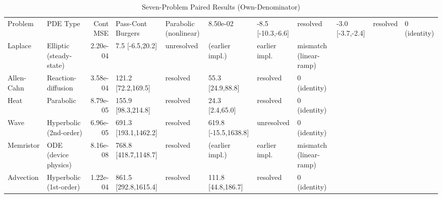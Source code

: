 \begin{table}[htbp]
\centering
\caption{Seven-Problem Paired Results (Own-Denominator)}
\label{tab:sevenprob}
\begin{tabular}{llrlllll}
\hline
Problem & PDE Type & Cont MSE & Pass-Cont %
\hline
Burgers & Parabolic (nonlinear) & 8.50e-02 & -8.5 [-10.3,-6.6] & resolved & -3.0 [-3.7,-2.4] & resolved & 0 (identity) \\
Laplace & Elliptic (steady-state) & 2.20e-04 & 7.5 [-6.5,20.2] & unresolved & (earlier impl.) & earlier impl. & mismatch (linear-ramp) \\
Allen-Cahn & Reaction-diffusion & 3.58e-04 & 121.2 [72.2,169.5] & resolved & 55.3 [24.9,88.8] & resolved & 0 (identity) \\
Heat & Parabolic & 8.79e-05 & 155.9 [98.3,214.8] & resolved & 24.3 [2.4,65.0] & resolved & 0 (identity) \\
Wave & Hyperbolic (2nd-order) & 6.96e-05 & 691.3 [193.1,1462.2] & resolved & 619.8 [-15.5,1638.8] & unresolved & 0 (identity) \\
Memristor & ODE (device physics) & 8.16e-08 & 768.8 [418.7,1148.7] & resolved & (earlier impl.) & earlier impl. & mismatch (linear-ramp) \\
Advection & Hyperbolic (1st-order) & 1.22e-04 & 861.5 [292.8,1615.4] & resolved & 111.8 [44.8,186.7] & resolved & 0 (identity) \\
\hline
\end{tabular}
\end{table}
